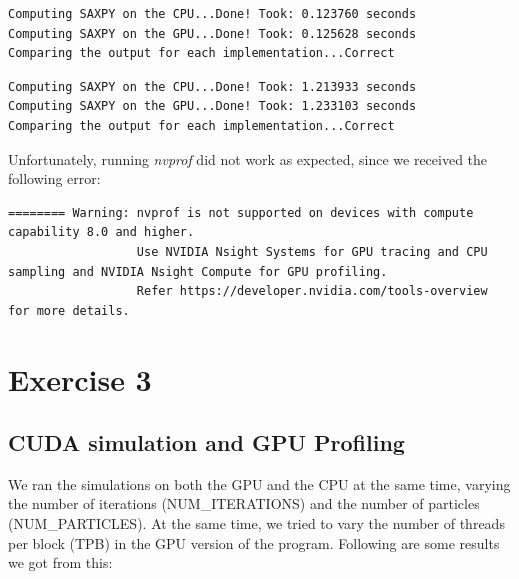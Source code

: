 \documentclass[english]{exam}
\begin{document}
\begin{lstlisting}
Computing SAXPY on the CPU...Done! Took: 0.123760 seconds
Computing SAXPY on the GPU...Done! Took: 0.125628 seconds
Comparing the output for each implementation...Correct
\end{lstlisting}

\begin{lstlisting}
Computing SAXPY on the CPU...Done! Took: 1.213933 seconds
Computing SAXPY on the GPU...Done! Took: 1.233103 seconds
Comparing the output for each implementation...Correct
\end{lstlisting}

\noindent
Unfortunately, running \textit{nvprof} did not work as expected, since we received the following error:\\

\begin{lstlisting}[style=CStyle]
======== Warning: nvprof is not supported on devices with compute capability 8.0 and higher.
                  Use NVIDIA Nsight Systems for GPU tracing and CPU sampling and NVIDIA Nsight Compute for GPU profiling.
                  Refer https://developer.nvidia.com/tools-overview for more details.
\end{lstlisting}

\clearpage 
\chapter{Exercise 3}
\section*{CUDA simulation and GPU Profiling}

We ran the simulations on both the GPU and the CPU at the same time, varying the number of iterations (NUM\_ITERATIONS) and the number of particles (NUM\_PARTICLES). At the same time, we tried to vary the number of threads per block (TPB) in the GPU version of the program. Following are some results we got from this:
\end{document}
